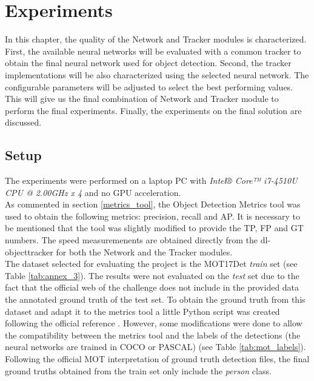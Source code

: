 \chapter{Experiments}
In this chapter, the quality of the Network and Tracker modules is characterized. First, the available neural networks will be evaluated with a common tracker to obtain the final neural network used for object detection. Second, the tracker implementations will be also characterized using the selected neural network. The configurable parameters will be adjusted to select the best performing values. This will give us the final combination of Network and Tracker module to perform the final experiments. Finally, the experiments on the final solution are discussed.\\
\section{Setup}
The experiments were performed on a laptop PC with \textit{Intel® Core™ i7-4510U CPU @ 2.00GHz x 4} and no GPU acceleration.\\ As commented in section \ref{metrics_tool}, the Object Detection Metrics tool was used to obtain the following metrics: precision, recall and AP. It is necessary to be mentioned that the tool was slightly modified to provide the TP, FP and GT numbers. The speed measuremenents are obtained directly from the dl-objecttracker for both the Network and the Tracker modules.\\
The dataset selected for evaluating the project is the MOT17Det \cite{milan2016mot16} \textit{train} set (see Table \ref{tab:annex_3}). The results were not evaluated on the \textit{test} set due to the fact that the official web of the challenge does not include in the provided data the annotated ground truth of the test set. To obtain the ground truth from this dataset and adapt it to the metrics tool a little Python script was created following the official reference \cite{milan2016mot16}. However, some modifications were done to allow the compatibility between the metrics tool and the labels of the detections (the neural networks are trained in COCO or PASCAL) (see Table \ref{tab:mot_labels}). Following the official MOT interpretation of ground truth detection files, the final ground truths obtained from the train set only include the \textit{person} class.
